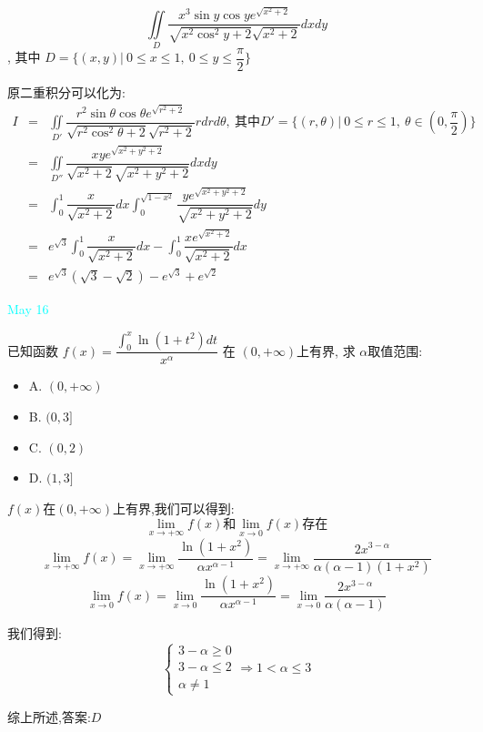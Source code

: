 \begin{example}[][Exam: 31.3.2]
	$$\iint\limits_{D}\dfrac{x^3\sin y\cos y e^{\sqrt{x^2+2}}}{\sqrt{x^2\cos^2y+2}\sqrt{x^2+2}}dxdy$$,
	其中 $D=\{(x,y)|\ 0\leq x\leq 1,\ 0\leq y\leq \dfrac{\pi}{2}\}$
\end{example}
 
\begin{solution}
	
	原二重积分可以化为: 
	\begin{eqnarray*}
		I&=&\iint\limits_{D'}\dfrac{r^2\sin \theta\cos \theta e^{\sqrt{r^2+2}}}{\sqrt{r^2\cos^2\theta+2}\sqrt{r^2+2}}rdrd\theta,\ \text{其中}D'=\{(r,\theta)|\ 0\leq r\leq 1,\ \theta\in(0,\dfrac{\pi}{2})\}\\
		&=&\iint\limits_{D''}\dfrac{xye^{\sqrt{x^2+y^2+2}}}{\sqrt{x^2+2}\sqrt{x^2+y^2+2}}dxdy\\
		&=&\int_{0}^{1}\dfrac{x}{\sqrt{x^2+2}}dx\int_{0}^{\sqrt{1-x^2}}\dfrac{ye^{\sqrt{x^2+y^2+2}}}{\sqrt{x^2+y^2+2}}dy\\
		&=&e^{\sqrt{3}}\int_{0}^{1}\dfrac{x}{\sqrt{x^2+2}}dx-\int_{0}^{1}\dfrac{xe^{\sqrt{x^2+2}}}{\sqrt{x^2+2}}dx\\
		&=&e^{\sqrt{3}}(\sqrt{3}-\sqrt{2})-e^{\sqrt{3}}+e^{\sqrt{2}}
	\end{eqnarray*}
\end{solution}


\textcolor{cyan}{May 16}

\begin{example}[][Exam: 31.3.3]
	已知函数 $f(x)=\dfrac{\int_{0}^{x}\ln(1+t^2)dt}{x^{\alpha}}$ 在 $(0,+\infty)$上有界, 求 $\alpha$取值范围: 
\begin{itemize}
	\item A. $(0,+\infty)$ 
	\item B. $(0,3]$ 
	\item C. $(0,2)$ 
	\item D. $(1,3]$ 
\end{itemize}
\end{example}

\begin{solution}
	
	$f(x)$在$(0,+\infty)$上有界,我们可以得到: 
	$$\lim\limits_{x\to +\infty}f(x)\text{和}\lim\limits_{x\to 0}f(x)\text{存在}$$
	$$\lim\limits_{x\to +\infty}f(x)=\lim\limits_{x\to +\infty}\dfrac{\ln(1+x^2)}{\alpha x^{\alpha-1}}=\lim\limits_{x\to +\infty}\dfrac{2x^{3-\alpha}}{\alpha(\alpha-1)(1+x^2)}$$
	$$\lim\limits_{x\to 0}f(x)=\lim\limits_{x\to 0}\dfrac{\ln(1+x^2)}{\alpha x^{\alpha-1}}=\lim\limits_{x\to 0}\dfrac{2x^{3-\alpha}}{\alpha(\alpha-1)}$$
	
	我们得到: 
	$$\left\lbrace 
	\begin{array}{l}
		3-\alpha\geq 0\\
		3-\alpha\leq 2\\
		\alpha\neq 1
	\end{array}
	\right. \Rightarrow 1<\alpha\leq 3$$
	
	综上所述,答案:$D$
\end{solution}

